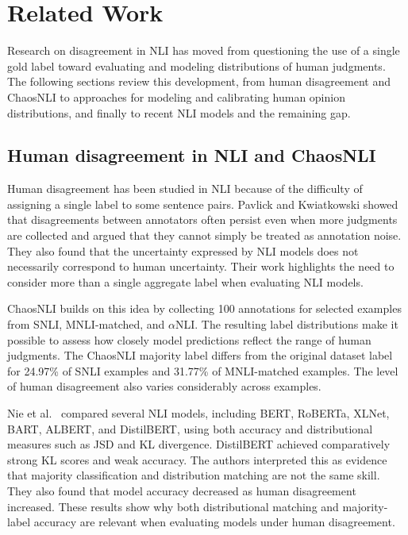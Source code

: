 \documentclass[11pt,a4paper]{article}
\begin{document}
\section{Related Work}

Research on disagreement in NLI has moved from questioning the use of a single gold label toward evaluating and modeling distributions of human judgments. The following sections review this development, from human disagreement and ChaosNLI to approaches for modeling and calibrating human opinion distributions, and finally to recent NLI models and the remaining gap.

\subsection{Human disagreement in NLI and ChaosNLI}

Human disagreement has been studied in NLI because of the difficulty of assigning a single label to some sentence pairs. Pavlick and Kwiatkowski \cite{pavlick2019inherent} showed that disagreements between annotators often persist even when more judgments are collected and argued that they cannot simply be treated as annotation noise. They also found that the uncertainty expressed by NLI models does not necessarily correspond to human uncertainty. Their work highlights the need to consider more than a single aggregate label when evaluating NLI models.

ChaosNLI \cite{nie2020chaosnli} builds on this idea by collecting 100 annotations for selected examples from SNLI, MNLI-matched, and $\alpha$NLI. The resulting label distributions make it possible to assess how closely model predictions reflect the range of human judgments. The ChaosNLI majority label differs from the original dataset label for 24.97\% of SNLI examples and 31.77\% of MNLI-matched examples. The level of human disagreement also varies considerably across examples.

Nie et al.\ \cite{nie2020chaosnli} compared several NLI models, including BERT, RoBERTa, XLNet, BART, ALBERT, and DistilBERT, using both accuracy and distributional measures such as JSD and KL divergence. DistilBERT achieved comparatively strong KL scores and weak accuracy. The authors interpreted this as evidence that majority classification and distribution matching are not the same skill. They also found that model accuracy decreased as human disagreement increased. These results show why both distributional matching and majority-label accuracy are relevant when evaluating models under human disagreement.
\end{document}
